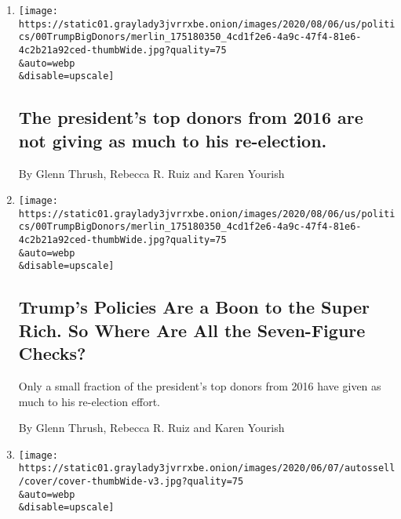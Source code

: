 \begin{enumerate}
\def\labelenumi{\arabic{enumi}.}
\item
  \href{/2020/08/17/us/elections/the-presidents-top-donors-from-2016-are-not-giving-as-much-to-his-re-election.html}{}

  \texttt{[image: https://static01.graylady3jvrrxbe.onion/images/2020/08/06/us/politics/00TrumpBigDonors/merlin\_175180350\_4cd1f2e6-4a9c-47f4-81e6-4c2b21a92ced-thumbWide.jpg?quality=75\\\&auto=webp\\\&disable=upscale]}

  \hypertarget{the-presidents-top-donors-from-2016-are-not-giving-as-much-to-his-re-election}{%
  \subsection{The president's top donors from 2016 are not giving as
  much to his
  re-election.}\label{the-presidents-top-donors-from-2016-are-not-giving-as-much-to-his-re-election}}

  By Glenn Thrush, Rebecca R. Ruiz and Karen Yourish
\item
  \href{/2020/08/16/us/politics/trumps-campaign-big-donors.html}{}

  \texttt{[image: https://static01.graylady3jvrrxbe.onion/images/2020/08/06/us/politics/00TrumpBigDonors/merlin\_175180350\_4cd1f2e6-4a9c-47f4-81e6-4c2b21a92ced-thumbWide.jpg?quality=75\\\&auto=webp\\\&disable=upscale]}

  \hypertarget{trumps-policies-are-a-boon-to-the-super-rich-so-where-are-all-the-seven-figure-checks}{%
  \subsection{Trump's Policies Are a Boon to the Super Rich. So Where
  Are All the Seven-Figure
  Checks?}\label{trumps-policies-are-a-boon-to-the-super-rich-so-where-are-all-the-seven-figure-checks}}

  Only a small fraction of the president's top donors from 2016 have
  given as much to his re-election effort.

  By Glenn Thrush, Rebecca R. Ruiz and Karen Yourish
\item
  \href{/interactive/2020/06/07/us/george-floyd-protest-aerial-photos.html}{}

  \texttt{[image: https://static01.graylady3jvrrxbe.onion/images/2020/06/07/autossell/cover/cover-thumbWide-v3.jpg?quality=75\\\&auto=webp\\\&disable=upscale]}

  \hypertarget{birds-eye-view-of-protests-across-the-us-and-around-the-world}{%
}
\end{enumerate}
